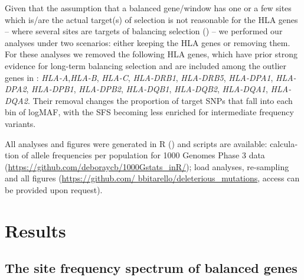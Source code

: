 \begin{refsection}
\begin{otherlanguage}{english}
Given that the assumption that a balanced gene/window has one or a few sites which is/are the actual target(s) of selection is not reasonable for the HLA genes -- where several sites are targets of balancing selection (\cite{Hughes1988,Bitarello2015}) -- we performed our analyses under two scenarios: either keeping the HLA genes or removing them. For these analyses we removed the following HLA genes, which have prior strong evidence for long-term balancing selection and are included among the outlier genes in \textcite{Bitarello2016}: \emph{HLA-A},\emph{HLA-B}, \emph{HLA-C}, \emph{HLA-DRB1}, \emph{HLA-DRB5}, \emph{HLA-DPA1}, \emph{HLA-DPA2}, \emph{HLA-DPB1}, \emph{HLA-DPB2}, \emph{HLA-DQB1}, \emph{HLA-DQB2}, \emph{HLA-DQA1}, \emph{HLA-DQA2}. Their removal changes the proportion of target SNPs that fall into each bin of logMAF, with the SFS becoming less enriched for intermediate frequency variants. 

All analyses and figures were generated in R (\cite{RDevelopmentCoreTeam2009}) and scripts are available: calculation of allele frequencies per population for 1000 Genomes Phase 3 data (\url{https://github.com/deboraycb/1000Gstats_inR/}); load analyses, re-sampling and all figures (\url{https://github.com/ bbitarello/deleterious_mutations}, access can be provided upon request).

\section{Results}
\subsection{The site frequency spectrum of balanced genes}


\end{otherlanguage}
\end{refsection}
